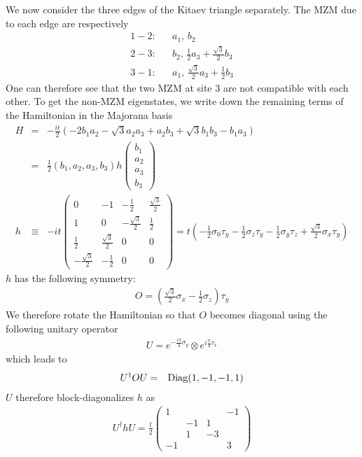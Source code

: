 We now consider the three edges of the Kitaev triangle separately. The MZM due to each edge are respectively
\begin{eqnarray}
	1-2:&& a_1,\,b_2\\\nonumber
	2-3:&& b_2,\,\frac{1}{2}a_3 + \frac{\sqrt{3}}{2}b_3\\\nonumber
	3-1:&& a_1,\, \frac{\sqrt{3}}{2}a_3 + \frac{1}{2} b_3
\end{eqnarray}
One can therefore see that the two MZM at site 3 are not compatible with each other. To get the non-MZM eigenstates, we write down the remaining terms of the Hamiltonian in the Majorana basis
\begin{eqnarray}
	H &=& -\frac{it}{2}\left( -2b_1 a_2 - \sqrt{3} a_2 a_3 + a_2 b_3 + \sqrt{3} b_1 b_3 - b_1 a_3   \right)\\\nonumber
	&=&\frac{1}{2}(b_1, a_2, a_3, b_3)h\begin{pmatrix}
	b_1\\
	a_2\\
	a_3\\
	b_3
\end{pmatrix}\\\nonumber
h&\equiv&-it\begin{pmatrix}
	0 & -1 & -\frac{1}{2} & \frac{\sqrt{3}}{2} \\
	1 & 0 & -\frac{\sqrt{3}}{2} & \frac{1}{2}\\
	\frac{1}{2} & \frac{\sqrt{3}}{2} & 0 & 0 \\
	-\frac{\sqrt{3}}{2} & -\frac{1}{2} & 0 & 0
\end{pmatrix} = t\left( -\frac{1}{2}\sigma_0 \tau_y - \frac{1}{2}\sigma_z\tau_y -\frac{1}{2}\sigma_y \tau_z + \frac{\sqrt{3}}{2} \sigma_x \tau_y \right)
\end{eqnarray}
$h$ has the following symmetry:
\begin{eqnarray}
	O = \left(\frac{\sqrt{3}}{2}\sigma_x - \frac{1}{2}\sigma_z\right) \tau_y
\end{eqnarray}
We therefore rotate the Hamiltonian so that $O$ becomes diagonal using the following unitary operator
\begin{eqnarray}
	U = e^{-\frac{i\pi}{3}\sigma_y}\otimes e^{i\frac{\pi}{4}\tau_x}
\end{eqnarray}
which leads to
\begin{eqnarray}
	U^\dag O U &=& {\rm Diag}(1,-1,-1,1)
\end{eqnarray}
$U$ therefore block-diagonalizes $h$ as
\begin{eqnarray}
	U^\dag h U = 	\frac{t}{2}\begin{pmatrix}
		1 &  &  & -1 \\
		& -1 & 1 & \\
		& 1 & -3 & \\
		-1 & & & 3
	\end{pmatrix}
\end{eqnarray}
